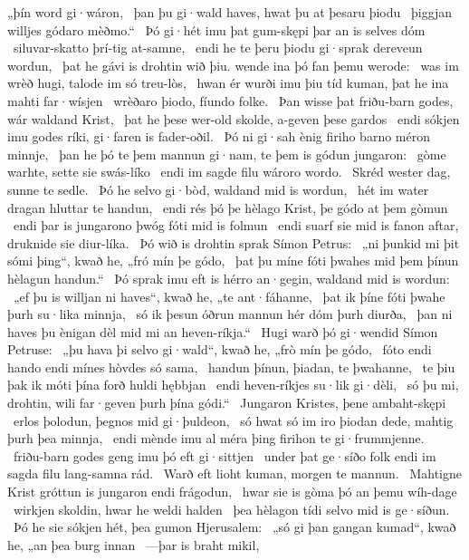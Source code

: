 „þín word gi·wáron, \hld\ þan þu gi·wald haves,
hwat þu at þesaru þiodu \hld\ þiggjan willjes
gódaro mèðmo.“ \hld\ Þó gi·hét imu þat gum-skępi þar
an is selves dóm \hld\ siluvar-skatto
þrí-tig at-samne, \hld\ endi he te þeru þiodu gi·sprak
dereveun wordun, \hld\ þat he gávi is drohtin wið þiu.
wende ina þó fan þemu werode: \hld\ was im wrèð hugi,
talode im só treu-lòs, \hld\ hwan ér wurði imu þiu tíd kuman,
þat he ina mahti far·wísjen \hld\ wrèðaro þiodo,
fíundo folke. \hld\ Þan wisse þat friðu-barn godes,
wár waldand Krist, \hld\ þat he þese wer-old skolde,
a-geven þese gardos \hld\ endi sókjen imu godes ríki,
gi·faren is fader-oðil. \hld\ Þó ni gi·sah ènig firiho barno
méron minnje, \hld\ þan he þó te þem mannun gi·nam,
te þem is gódun jungaron: \hld\ gòme warhte,
sette sie swás-líko \hld\ endi im sagde filu
wároro wordo. \hld\ Skréd wester dag,
sunne te sedle. \hld\ Þó he selvo gi·bòd,
waldand mid is wordun, \hld\ hét im water dragan
hluttar te handun, \hld\ endi rés þó þe hèlago Krist,
þe gódo at þem gòmun \hld\ endi þar is jungarono þwóg
fóti mid is folmun \hld\ endi suarf sie mid is fanon aftar,
druknide sie diur-líka. \hld\ Þó wið is drohtin sprak
Símon Petrus: \hld\ „ni þunkid mi þit sómi þing“, kwað he,
„fró mín þe gódo, \hld\ þat þu míne fóti þwahes
mid þem þínun hèlagun handun.“ \hld\ Þó sprak imu eft is hérro an·gegin,
waldand mid is wordun: \hld\ „ef þu is willjan ni haves“, kwað he,
„te ant·fáhanne, \hld\ þat ik þíne fóti þwahe
þurh su·lika minnja, \hld\ só ik þesun óðrun mannun hér
dóm þurh diurða, \hld\ þan ni haves þu ènigan dèl mid mi
an heven-ríkja.“ \hld\ Hugi warð þó gi·wendid
Símon Petruse: \hld\ „þu hava þi selvo gi·wald“, kwað he,
„frò mín þe gódo, \hld\ fóto endi hando
endi mínes hòvdes só sama, \hld\ handun þínun,
þiadan, te þwahanne, \hld\ te þiu þak ik móti þína forð
huldi hębbjan \hld\ endi heven-ríkjes
su·lik gi·dèli, \hld\ só þu mi, drohtin, wili
far·geven þurh þína gódi.“ \hld\ Jungaron Kristes,
þene ambaht-skępi \hld\ erlos þolodun,
þegnos mid gi·þuldeon, \hld\ só hwat só im iro þiodan dede,
mahtig þurh þea minnja, \hld\ endi mènde imu al méra þing
firihon te gi·frummjenne. \hld\ friðu-barn godes
geng imu þó eft gi·sittjen \hld\ under þat ge·síðo folk
endi im sagda filu lang-samna rád. \hld\ Warð eft lioht kuman,
morgen te mannun. \hld\ Mahtigne Krist
gróttun is jungaron endi frágodun, \hld\ hwar sie is gòma þó
an þemu wíh-dage \hld\ wirkjen skoldin,
hwar he weldi halden \hld\ þea hèlagon tídi
selvo mid is ge·síðun. \hld\ Þó he sie sókjen hét,
þea gumon Hjerusalem: \hld\ „só gi þan gangan kumad“, kwað he,
„an þea burg innan \hld\ —þar is braht mikil,
